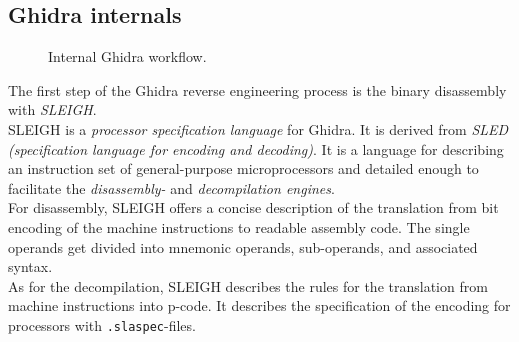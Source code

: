 \documentclass[seminar]{plai}
\begin{document}
\subsection{Ghidra internals}
\label{sec:angr-internals}
\begin{figure}[htbp]
\centering
{}
\caption{Internal Ghidra workflow.\cite{formal-semantics-for-P-Code}}
\label{fig:ghidra-flow}
\end{figure}

\noindent The first step of the Ghidra reverse engineering process is the binary disassembly with \textit{SLEIGH}.\cite{formal-semantics-for-P-Code}\\
SLEIGH is a \textit{processor specification language} for Ghidra. It is derived from \textit{SLED (specification language for encoding and decoding)}.
It is a language for describing an instruction set of general-purpose microprocessors and detailed enough to facilitate the \textit{disassembly-} and \textit{decompilation engines}.\\
For disassembly, SLEIGH offers a concise description of the translation from bit encoding of the machine instructions to readable assembly code. The single operands get divided into mnemonic operands, sub-operands, and associated syntax.\cite{sleigh-a-language-for-rapid-processor-specification}\\
As for the decompilation, SLEIGH describes the rules for the translation from machine instructions into p-code.
It describes the specification of the encoding for processors with \texttt{.slaspec}-files.\cite{sleigh-a-language-for-rapid-processor-specification, ghidra-book-definite-guide}

\end{document}
